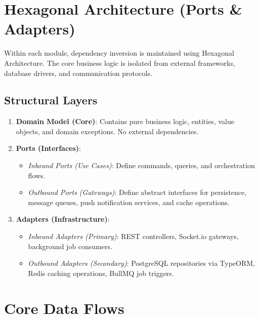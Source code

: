 \documentclass[11pt,a4paper]{report}
\begin{document}
\section{Hexagonal Architecture (Ports \& Adapters)}
Within each module, dependency inversion is maintained using Hexagonal Architecture. The core business logic is isolated from external frameworks, database drivers, and communication protocols.

\subsection{Structural Layers}
\begin{enumerate}
    \item \textbf{Domain Model (Core)}: Contains pure business logic, entities, value objects, and domain exceptions. No external dependencies.
    \item \textbf{Ports (Interfaces)}:
        \begin{itemize}
            \item \emph{Inbound Ports (Use Cases)}: Define commands, queries, and orchestration flows.
            \item \emph{Outbound Ports (Gateways)}: Define abstract interfaces for persistence, message queues, push notification services, and cache operations.
        \end{itemize}
    \item \textbf{Adapters (Infrastructure)}:
        \begin{itemize}
            \item \emph{Inbound Adapters (Primary)}: REST controllers, Socket.io gateways, background job consumers.
            \item \emph{Outbound Adapters (Secondary)}: PostgreSQL repositories via TypeORM, Redis caching operations, BullMQ job triggers.
        \end{itemize}
\end{enumerate}

\section{Core Data Flows}
\end{document}
